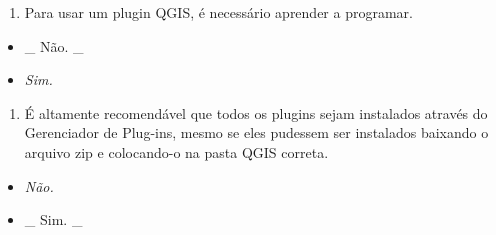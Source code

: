 \documentclass[
]{book}
\providecommand{\tightlist}{%
  \setlength{\itemsep}{0pt}\setlength{\parskip}{0pt}}
\begin{document}
\begin{enumerate}
\def\labelenumi{\arabic{enumi}.}
\setcounter{enumi}{1}
\tightlist
\item
  Para usar um plugin QGIS, é necessário aprender a programar.
\end{enumerate}

\begin{itemize}
\tightlist
\item
  \_ { Não. } \_
\item
  \emph{Sim. }
\end{itemize}

\begin{enumerate}
\def\labelenumi{\arabic{enumi}.}
\setcounter{enumi}{2}
\tightlist
\item
  É altamente recomendável que todos os plugins sejam instalados através do Gerenciador de Plug-ins, mesmo se eles pudessem ser instalados baixando o arquivo zip e colocando-o na pasta QGIS correta.
\end{enumerate}

\begin{itemize}
\tightlist
\item
  \emph{Não.}
\item
  \_ { Sim. } \_
\end{itemize}
\end{document}
